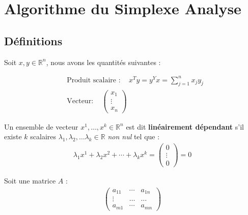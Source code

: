 \documentclass{report}
\begin{document}
\begin{multicols*}{2}
\begin{table}[H]
\begin{center}
\begin{tabular}{|l|l l l l l |l|l|}
                        \end{tabular}
                \end{center}
        \end{table}

    \pagebreak
    \chapter{Algorithme du Simplexe Analyse}

    \section{Définitions}

    Soit $x, y \in \mathbb{R}^n$, nous avons les quantités suivantes :

    \begin{align*}
        &\text{Produit scalaire } : \quad  x^{T}y = y^Yx = \sum_{j=1}^{n }x_jy_j \\ 
        &\text{Vecteur} : \quad
        \begin{pmatrix} x_1 \\ \vdots \\ x_n \end{pmatrix} \;
    \end{align*}            


    \begin{note}{}{}
        Un ensemble de vecteur $x^1, \dots, x^k \in \mathbb{R}^n$ 
        est dit \textbf{linéairement dépendant} s'il existe  
        $k$ scalaires $\lambda_{1}, \lambda_{2}, \dots \lambda_{k} 
        \in \mathbb{R}$ \textit{non nul} tel que :  
        \begin{align*}
            \lambda_{1}x^1 + \lambda_{2}x^2  + 
            \cdots 
            + \lambda_{k}x^k = 
        \begin{pmatrix} 0 \\ \vdots \\ 0 \end{pmatrix}  = 0
        \end{align*}
    \end{note}  

    Soit une matrice $A$ : 
        \begin{align*}
                        \begin{pmatrix} 
            a_{11} &  \cdots & a_{1n}  \\ 
            \vdots &  \ldots & \ldots \\ 
            a_{m1} &  \cdots & a_{mn}
            \end{pmatrix}
        \end{align*}


\end{multicols*}
\end{document}
